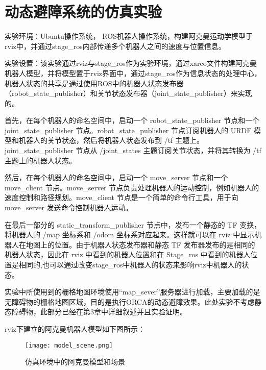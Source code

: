 








\section{动态避障系统的仿真实验}
实验环境：Ubuntu操作系统， ROS机器人操作系统，构建阿克曼运动学模型于rviz中，并通过stage\_ros内部传递多个机器人之间的速度与位置信息。

实验设置：该实验通过rviz与stage\_ros作为实验环境，通过xarco文件构建阿克曼机器人模型，并将模型置于rviz界面中，通过stage\_ros作为信息状态的处理中心，机器人状态的共享是通过使用ROS中的机器人状态发布器（robot\_state\_publisher）和关节状态发布器（joint\_state\_publisher）来实现的。

首先，在每个机器人的命名空间中，启动一个 robot\_state\_publisher 节点和一个 joint\_state\_publisher 节点。robot\_state\_publisher 节点订阅机器人的 URDF 模型和机器人的关节状态，然后将机器人状态发布到 /tf 主题上。joint\_state\_publisher 节点从 /joint\_states 主题订阅关节状态，并将其转换为 /tf 主题上的机器人状态。

然后，在每个机器人的命名空间中，启动一个 move\_server 节点和一个 move\_client 节点。move\_server 节点负责处理机器人的运动控制，例如机器人的速度控制和路径规划。move\_client 节点是一个简单的命令行工具，用于向 move\_server 发送命令控制机器人运动。

在最后一部分的 static\_transform\_publisher 节点中，发布一个静态的 TF 变换，将机器人的 /map 坐标系和 /odom 坐标系对应起来。这样就可以在 rviz 中显示机器人在地图上的位置。由于机器人状态发布器和静态 TF 发布器发布的是相同的机器人状态，因此在 rviz 中看到的机器人位置和在 Stage\_ros 中看到的机器人位置是相同的,也可以通过改变stage\_ros中机器人的状态来影响rviz中机器人的状态。

实验中所使用到的栅格地图环境使用“map\_sever”服务器进行加载，主要加载的是无障碍物的栅格地图区域，目的是执行ORCA的动态避障效果。此处实验不考虑静态障碍物，此部分已经在第3章中详细叙述并且实验证明。

rviz下建立的阿克曼机器人模型如下图所示：
\begin{figure}[ht]
    \centering
    \texttt{[image: model\_scene.png]}
    \caption{仿真环境中的阿克曼模型和场景}
\end{figure}


